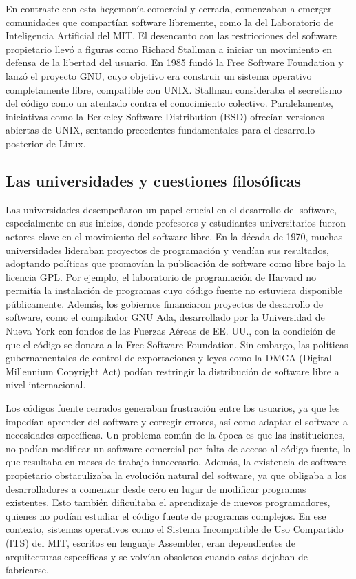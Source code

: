 \documentclass[a4paper,12pt]{article}
\begin{document}
En contraste con esta hegemonía comercial y cerrada, comenzaban a emerger
comunidades que compartían software libremente, como la del Laboratorio de
Inteligencia Artificial del MIT. El desencanto con las restricciones del
software propietario llevó a figuras como Richard Stallman a iniciar un
movimiento en defensa de la libertad del usuario. En 1985 fundó la Free Software
Foundation y lanzó el proyecto GNU, cuyo objetivo era construir un sistema
operativo completamente libre, compatible con UNIX. Stallman consideraba el
secretismo del código como un atentado contra el conocimiento colectivo.
Paralelamente, iniciativas como la Berkeley Software Distribution (BSD) ofrecían
versiones abiertas de UNIX, sentando precedentes fundamentales para el
desarrollo posterior de Linux.

\subsection{Las universidades y cuestiones filosóficas}
Las universidades desempeñaron un papel crucial en el desarrollo del software,
especialmente en sus inicios, donde profesores y estudiantes universitarios
fueron actores clave en el movimiento del software libre. En la década de 1970,
muchas universidades lideraban proyectos de programación y vendían sus
resultados, adoptando políticas que promovían la publicación de software como
libre bajo la licencia GPL. Por ejemplo, el laboratorio de programación de
Harvard no permitía la instalación de programas cuyo código fuente no estuviera
disponible públicamente. Además, los gobiernos financiaron proyectos de
desarrollo de software, como el compilador GNU Ada, desarrollado por la
Universidad de Nueva York con fondos de las Fuerzas Aéreas de EE. UU., con la
condición de que el código se donara a la Free Software Foundation. Sin embargo,
las políticas gubernamentales de control de exportaciones y leyes como la DMCA
(Digital Millennium Copyright Act) podían restringir la distribución de software
libre a nivel internacional.

Los códigos fuente cerrados generaban frustración entre los usuarios, ya que les
impedían aprender del software y corregir errores, así como adaptar el software
a necesidades específicas. Un problema común de la época es que las instituciones,
no podían modificar un software comercial por falta de acceso al código fuente,
lo que resultaba en meses de trabajo innecesario. Además, la existencia de
software propietario obstaculizaba la evolución natural del software, ya que
obligaba a los desarrolladores a comenzar desde cero en lugar de modificar
programas existentes. Esto también dificultaba el aprendizaje de nuevos
programadores, quienes no podían estudiar el código fuente de programas
complejos. En ese contexto, sistemas operativos como el Sistema Incompatible de
Uso Compartido (ITS) del MIT, escritos en lenguaje Assembler, eran dependientes
de arquitecturas específicas y se volvían obsoletos cuando estas dejaban de
fabricarse. 
\end{document}
